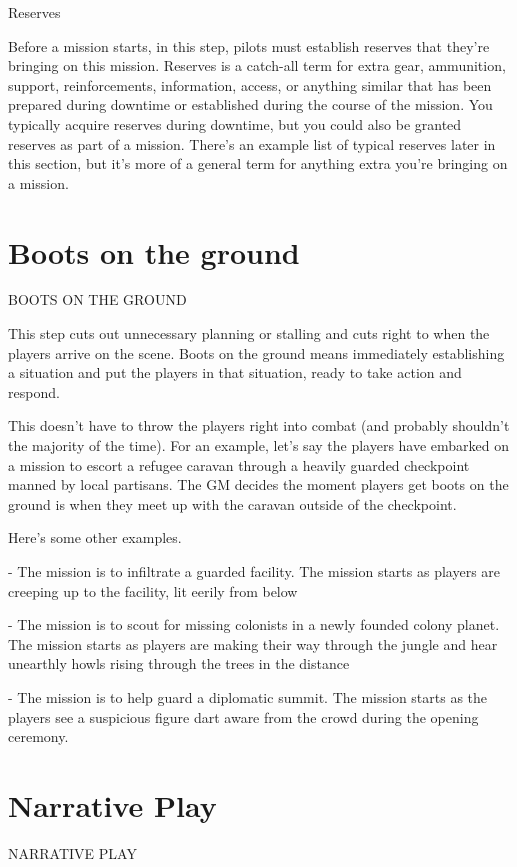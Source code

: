                                                     Reserves


Before a mission starts, in this step, pilots must establish reserves that they’re bringing on this
mission. Reserves is a catch-all term for extra gear, ammunition, support, reinforcements,
information, access, or anything similar that has been prepared during downtime or established
during the course of the mission. You typically acquire reserves during downtime, but you could
also be granted reserves as part of a mission. There’s an example list of typical reserves later in
this section, but it’s more of a general term for anything extra you’re bringing on a mission.

\chapter{Boots on the ground}
                                  BOOTS ON THE GROUND


This step cuts out unnecessary planning or stalling and cuts right to when the players arrive on
the scene. Boots on the ground means immediately establishing a situation and put the players
in that situation, ready to take action and respond.


This doesn’t have to throw the players right into combat (and probably shouldn’t the majority of
the time). For an example, let’s say the players have embarked on a mission to escort a refugee
caravan through a heavily guarded checkpoint manned by local partisans. The GM decides the
moment players get boots on the ground is when they meet up with the caravan outside of the
checkpoint.


Here’s some other examples.

         	- The mission is to infiltrate a guarded facility. The mission starts as players are creeping
         up to the facility, lit eerily from below

         	- The mission is to scout for missing colonists in a newly founded colony planet. The
         mission starts as players are making their way through the jungle and hear unearthly
         howls rising through the trees in the distance

         	- The mission is to help guard a diplomatic summit. The mission starts as the players see
         a suspicious figure dart aware from the crowd during the opening ceremony.

\chapter{Narrative Play}
                                  NARRATIVE PLAY


